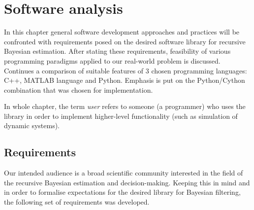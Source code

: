 \chapter{Software analysis}

In this chapter general software development approaches and practices will be confronted with
requirements posed on the desired software library for recursive Bayesian estimation. After stating these
requirements, feasibility of various programming paradigms applied to our real-world problem is
discussed. Continues a comparison of suitable features of 3 chosen programming
languages: C++, MATLAB language and Python. Emphasis is put on the Python/Cython combination that was
chosen for implementation.

In whole chapter, the term \emph{user} refers to someone (a programmer) who uses the library in
order to implement higher-level functionality (such as simulation of dynamic systems).

\section{Requirements} \label{sec:Requirements}

Our intended audience is a broad scientific community interested in the field of the recursive
Bayesian estimation and decision-making. Keeping this in mind and in order to formalise expectations for
the desired library for Bayesian filtering, the following set of requirements was developed.

